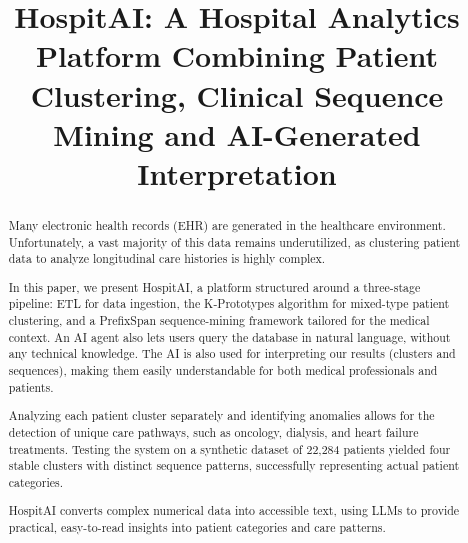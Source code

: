 \documentclass[conference]{IEEEtran}
\begin{document}
\title{HospitAI: A Hospital Analytics Platform Combining Patient Clustering, Clinical Sequence Mining and AI-Generated Interpretation}

\author{
}

\maketitle
\thispagestyle{plain}
\pagestyle{plain}

\begin{abstract}
Many electronic health records (EHR) are generated in the healthcare environment. Unfortunately, a vast majority of this data remains underutilized, as clustering patient data to analyze longitudinal care histories is highly complex.

In this paper, we present HospitAI, a platform structured around a three-stage pipeline: ETL for data ingestion, the K-Prototypes algorithm for mixed-type patient clustering, and a PrefixSpan sequence-mining framework tailored for the medical context. An AI agent also lets users query the database in natural language, without any technical knowledge. The AI is also used for interpreting our results (clusters and sequences), making them easily understandable for both medical professionals and patients.

Analyzing each patient cluster separately and identifying anomalies allows for the detection of unique care pathways, such as oncology, dialysis, and heart failure treatments. Testing the system on a synthetic dataset of 22,284 patients yielded four stable clusters with distinct sequence patterns, successfully representing actual patient categories.

HospitAI converts complex numerical data into accessible text, using LLMs to provide practical, easy-to-read insights into patient categories and care patterns.
\end{abstract}

\vspace{6pt}










\end{document}
